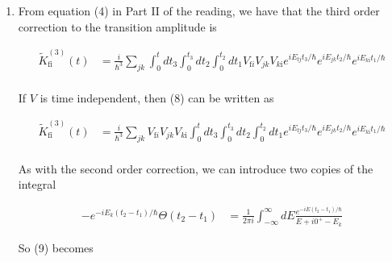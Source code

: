\documentclass[]{article}
\begin{document}
\begin{enumerate}[1)]
\begin{enumerate}[a)]
\end{enumerate}

\hfill \\
\noindent\rule{15cm}{0.4pt} \\

\item From equation (4) in Part II of the reading, we have that the third order correction to the transition amplitude is

\begin{equation}
\begin{split}
\tilde{K}_\text{fi}^{(3)}(t) & = \frac{i}{\hbar^3} \sum_{jk} \int_{0}^{t} dt_3 \int_{0}^{t_3} dt_2 \int_{0}^{t_2} dt_1 V_{\text{f} i} V_{jk} V_{k \text{i}} e^{ i E_{\text{f} j} t_3 /\hbar } e^{ i E_{jk} t_2 /\hbar } e^{ i E_{k \text{i} } t_1 /\hbar } \\
\end{split}
\end{equation}

If $V$ is time independent, then (8) can be written as

\begin{equation}
\begin{split}
\tilde{K}_\text{fi}^{(3)}(t) & = \frac{i}{\hbar^3} \sum_{jk} V_{\text{f} i} V_{jk} V_{k \text{i}}  \int_{0}^{t} dt_3 \int_{0}^{t_3} dt_2 \int_{0}^{t_2} dt_1  e^{ i E_{\text{f} j} t_3 /\hbar } e^{ i E_{jk} t_2 /\hbar } e^{ i E_{k \text{i} } t_1 /\hbar } \\
\end{split}
\end{equation}

As with the second order correction, we can introduce two copies of the integral

\begin{equation}
\begin{split}
-e^{-i E_k (t_2 - t_1)/\hbar} \Theta(t_2 - t_1) & = \frac{1}{2\pi i} \int_{-\infty}^{\infty} dE \frac{  e^{-i E(t_2 - t_1)/\hbar}  }{ E + i0^+ - E_k    }
\end{split}
\end{equation}

So (9) becomes


\end{enumerate}
\end{document}
